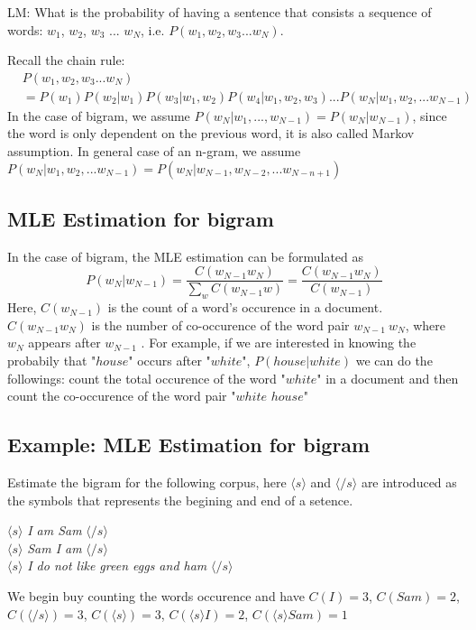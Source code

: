 \documentclass[12pt, oneside]{article}
\begin{document}
LM: What is the probability of having a sentence that consists a sequence of words: $w_1$, $w_2$, $w_3$ ... $w_N$, i.e. $P(w_1, w_2, w_3...w_N)$. 

Recall the chain rule:
\begin{align*}
&P(w_1, w_2, w_3...w_N)\\
&=P(w_1)P(w_2|w_1)P(w_3|w_1, w_2)P(w_4|w_1, w_2, w_3)...P(w_N|w_1, w_2, ...w_{N-1})
\end{align*}
In the case of bigram, we assume $P(w_N|w_1,...,w_{N-1})=P(w_N|w_{N-1})$, since the word is only dependent on the previous word, it is also called Markov assumption.
\vspace{0.2cm}
In general case of an n-gram, we assume $P(w_N|w_1, w_2, ...w_{N-1})=P(w_N|w_{N-1}, w_{N-2}, ...w_{N-n+1})$

\subsection{MLE Estimation for bigram }
In the case of bigram, the MLE estimation can be formulated as 
$$
P(w_N|w_{N-1})=\frac{C(w_{N-1}w_N)}{\sum_{w}C(w_{N-1}w)}=\frac{C(w_{N-1}w_N)}{C(w_{N-1})}
$$
Here, $C(w_{N-1})$ is the count of a word's occurence in a document. $C(w_{N-1}w_N)$ is the number of co-occurence of the word pair $w_{N-1}~w_{N}$, where $w_{N}$ appears after $w_{N-1}$ . For example, if we are interested in knowing the probabily that "$house$" occurs after "$white$", $P(house|white)$ we can do the followings: count the total occurence of the word "$white$" in a document and then count the co-occurence of the word pair "$white$ $house$"
 
\subsection{Example: MLE Estimation for bigram }
Estimate the bigram for the following corpus, here $\langle s \rangle$ and $\langle /s\rangle$ are introduced as the symbols that represents the begining and  end of a setence.

$\langle s \rangle$ \textit{I am Sam} $\langle /s\rangle$\\
$\langle s \rangle$ \textit{Sam I am} $\langle /s\rangle$\\
$\langle s \rangle$ \textit{I do not like green eggs and ham} $\langle /s \rangle$

We begin buy counting the words occurence and have $C(I)=3$, $C(Sam)=2$, $C(\langle /s\rangle)=3$, $C(\langle s\rangle)=3$, $C(\langle s \rangle I)=2$, $C(\langle s \rangle Sam)=1$
\end{document}
